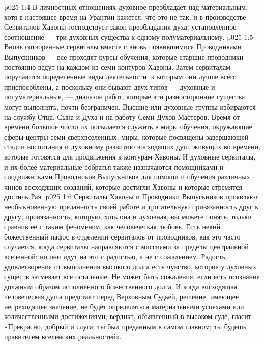 \vs p025 1:4 \pc В личностных отношениях духовное преобладает над материальным, хотя в настоящее время на Урантии кажется, что это не так; и в производстве Сервиталов Хавоны господствует закон преобладания духа; установленное соотношение --- три духовных существа к одному полуматериальному.
\vs p025 1:5 \pc Вновь сотворенные сервиталы вместе с вновь появившимися Проводниками Выпускников --- все проходят курсы обучения, которые старшие проводники постоянно ведут на каждом из семи контуров Хавоны. Затем сервиталам поручаются определенные виды деятельности, к которым они лучше всего приспособлены, а поскольку они бывают двух типов --- духовные и полуматериальные, --- диапазон работ, которые эти разносторонние существа могут выполнять, почти безграничен. Высшие или духовные группы избираются на службу Отца, Сына и Духа и на работу Семи Духов\hyp{}Мастеров. Время от времени большое число их посылается служить в миры обучения, окружающие сферы\hyp{}центры семи сверхвселенных, миры, которые посвящены завершающей стадии воспитания и духовному развитию восходящих душ, живущих во времени, которые готовятся для продвижения к контурам Хавоны. И духовные сервиталы, и их более материальные собратья также назначаются помощниками и сподвижниками Проводников Выпускников для помощи и обучения различных чинов восходящих созданий, которые достигли Хавоны и которые стремятся достичь Рая.
\vs p025 1:6 Сервиталы Хавоны и Проводники Выпускников проявляют необыкновенную преданность своей работе и трогательную привязанность друг к другу, привязанность, которую, хоть она и духовная, вы можете понять, только сравнив ее с таким феноменом, как человеческая любовь. Есть некий божественный пафос в отделении сервиталов от проводников, как это часто случается, когда сервиталы направляются с миссиями за пределы центральной вселенной; но они идут на это с радостью, а не с сожалением. Радость удовлетворения от выполнения высокого долга есть чувство, которое у духовных существ затмевает все остальные. Не может быть сожаления, если есть осознание должным образом исполненного божественного долга. И когда восходящая человеческая душа предстает перед Верховным Судьей, решение, имеющее непреходящее значение, не будет определяться материальными успехами или количественными достижениями; вердикт, объявленный в высоком суде, гласит: «Прекрасно, добрый и  слуга; ты был преданным в самом главном; ты будешь правителем вселенских реальностей».
